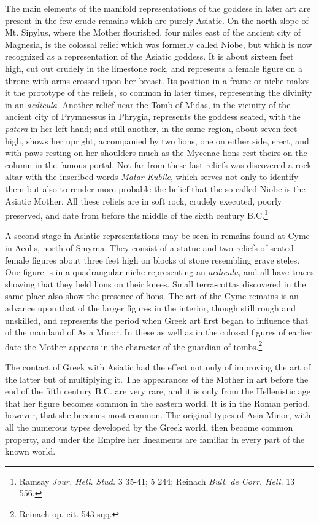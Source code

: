 \documentclass[a4paper, 11pt, oneside, polutonikogreek, english]{article}
\begin{document}
The main elements of the manifold representations of the goddess in later art are present in the few crude remains which are purely Asiatic. On the north slope of Mt. Sipylus, where the Mother flourished, four miles east of the ancient city of Magnesia, is the colossal relief which was formerly called Niobe, but which is now recognized as a representation of the Asiatic goddess. It is about sixteen feet high, cut out crudely in the limestone rock, and represents a female figure on a throne with arms crossed upon her breast. Its position in a frame or niche makes it the prototype of the reliefs, so common in later times, representing the divinity in an \emph{aedicula}. Another relief near the Tomb of Midas, in the vicinity of the ancient city of Prymnessus in Phrygia, represents the goddess seated, with the \emph{patera} in her left hand; and still another, in the same region, about seven feet high, shows her upright, accompanied by two lions, one on either side, erect, and with paws resting on her shoulders much as the Mycenae lions rest theirs on the column in the famous portal. Not far from these last reliefs was discovered a rock altar with the inscribed words \emph{Matar Kubile}, which serves not only to identify them but also to render more probable the belief that the so-called Niobe is the Asiatic Mother. All these reliefs are in soft rock, crudely executed, poorly preserved, and date from before the middle of the sixth century \textsc{B.C.}\footnote{Ramsay \emph{Jour. Hell. Stud.} 3 35-41; 5 244; Reinach \emph{Bull. de Corr. Hell.} 13 556.}

A second stage in Asiatic representations may be seen in remains found at Cyme in Aeolis, north of Smyrna. They consist of a statue and two reliefs of seated female figures about three feet high on blocks of stone resembling grave steles. One figure is in a quadrangular niche representing an \emph{aedicula}, and all have traces showing that they held lions on their knees. Small terra-cottas discovered in the same place also show the presence of lions. The art of the Cyme remains is an advance upon that of the larger figures in the interior, though still rough and unskilled, and represents the period when Greek art first began to influence that of the mainland of Asia Minor. In these as well as in the colossal figures of earlier date the Mother appears in the character of the guardian of tombs.\footnote{Reinach op. cit. 543 sqq.}

The contact of Greek with Asiatic had the effect not only of improving the art of the latter but of multiplying it. The appearances of the Mother in art before the end of the fifth century \textsc{B.C.} are very rare, and it is only from the Hellenistic age that her figure becomes common in the eastern world. It is in the Roman period, however, that she becomes most common. The original types of Asia Minor, with all the numerous types developed by the Greek world, then become common property, and under the Empire her lineaments are familiar in every part of the known world.
\end{document}

